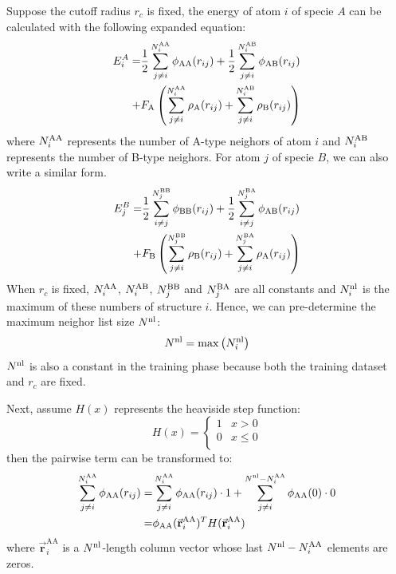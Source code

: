\documentclass[prb,reprint,superscriptaddress]{revtex4-2}
\begin{document}
Suppose the cutoff radius $r_c$ is fixed, the energy of atom $i$ of specie $A$ 
can be calculated with the following expanded equation:
\begin{align}
\label{eq:e_atom_phase_1}
E_{i}^{A} 
= & 
\frac{1}{2}\sum_{j\neq i}^{N_{i}^{\mathrm{AA}}}\phi_{\mathrm{AA}}(r_{ij}) +
\frac{1}{2}\sum_{j\neq i}^{N_{i}^{\mathrm{AB}}}\phi_{\mathrm{AB}}(r_{ij}) \nonumber \\
+ & F_{\mathrm{A}}\left(
    \sum_{j\neq i}^{N_{i}^{\mathrm{AA}}}{\rho_{\mathrm{A}}(r_{ij})} +
    \sum_{j\neq i}^{N_{i}^{\mathrm{AB}}}{\rho_{\mathrm{B}}(r_{ij})} 
\right)
\end{align}
where $N_{i}^{\mathrm{AA}}$ represents the number of A-type neighors of atom $i$ and 
$N_{i}^{\mathrm{AB}}$ represents the number of B-type neighors. For atom $j$ of specie $B$, we
can also write a similar form. 
\begin{align}
\label{eq:e_atom_phase_2}
E_{j}^{B} 
= & 
\frac{1}{2}\sum_{i \neq j}^{N_{j}^{\mathrm{BB}}}\phi_{\mathrm{BB}}(r_{ij}) +
\frac{1}{2}\sum_{i \neq j}^{N_{j}^{\mathrm{BA}}}\phi_{\mathrm{AB}}(r_{ij}) \nonumber \\
+ & F_{\mathrm{B}}\left(
    \sum_{j\neq i}^{N_{j}^{\mathrm{BB}}}{\rho_{\mathrm{B}}(r_{ij})} +
    \sum_{j\neq i}^{N_{j}^{\mathrm{BA}}}{\rho_{\mathrm{A}}(r_{ij})} 
\right)
\end{align}
When $r_c$ is fixed, $N_{i}^{\mathrm{AA}}$, $N_{i}^{\mathrm{AB}}$, $N_{j}^{\mathrm{BB}}$ and $N_{j}^{\mathrm{BA}}$ are all constants and
$N^{\mathrm{nl}}_i$ is the maximum of these numbers of structure $i$. Hence, we can 
pre-determine the maximum neighor list size $N^{\mathrm{nl}}$:
\begin{equation}
\label{eq:nnl}
N^{\mathrm{nl}} = \max{\left(N^{\mathrm{nl}}_i\right)}
\end{equation}
$N^{\mathrm{nl}}$ is also a constant in the training phase because both the training 
dataset and $r_c$ are fixed.

Next, assume $H(x)$ represents the heaviside step function:
\begin{equation}
\label{eq:heaviside}
H(x) = \begin{cases}
    1 & x > 0 \\
    0 & x \leq 0 \\
\end{cases}
\end{equation}
then the pairwise term can be transformed to:
\begin{align}
\sum_{j\neq i}^{N_{i}^{\mathrm{AA}}}\phi_{\mathrm{AA}}(r_{ij}) = &
\sum_{j\neq i}^{N_{i}^{\mathrm{AA}}}\phi_{\mathrm{AA}}(r_{ij}) \cdot 1 + 
\sum_{j\neq i}^{N^{\mathrm{nl}} - N_{i}^{\mathrm{AA}}}\phi_{\mathrm{AA}}(0) \cdot 0 \nonumber \\
= & \phi_{\mathrm{AA}}(\vec{\mathbf{r}}_{i}^{\mathrm{AA}})^T
H(\vec{\mathbf{r}}_{i}^{\mathrm{AA}})
\end{align}
where $\vec{\mathbf{r}}_{i}^{\mathrm{AA}}$ is a $N^{\mathrm{nl}}$-length column vector 
whose last $N^{\mathrm{nl}} - N_{i}^{\mathrm{AA}}$ elements are zeros.
\end{document}
